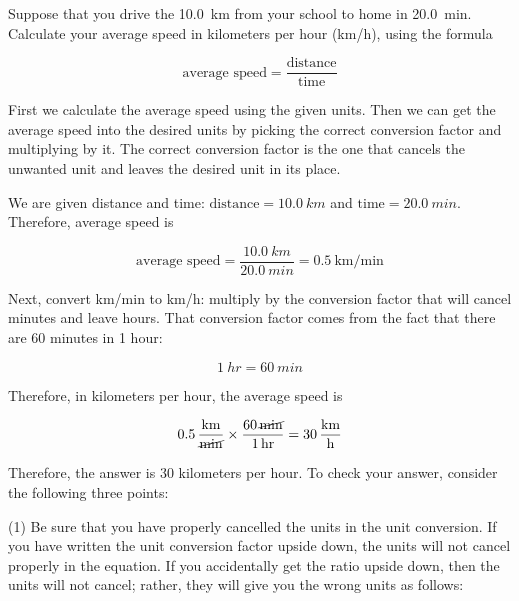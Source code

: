 \documentclass[main-ap-physics.tex]{subfiles}
\begin{document}
\begin{example} \label{W2DilL}
    Suppose that you drive the \SI{10.0}{km} from your school to home in \SI{20.0}{min}. Calculate your average speed in kilometers per hour (km/h), using the formula

    \begin{equation}
        \text{average speed} = \frac{\text{distance}}{\text{time}}
    \end{equation}
\end{example}

\Solution First we calculate the average speed using the given units. Then we can get the average speed into the desired units by picking the correct conversion factor and multiplying by it. The correct conversion factor is the one that cancels the unwanted unit and leaves the desired unit in its place.

\vspace{1em}

We are given distance and time: $\text{distance} = \SI{10.0}{km}$ and $\text{time} = \SI{20.0}{min}$. Therefore, average speed is

\begin{equation*}
    \text{average speed} = \frac{\SI{10.0}{km}}{\SI{20.0}{min}} = \SI[per-mode=fraction]{0.5}{\kilo\meter\per\minute}
\end{equation*}

Next, convert km/min to km/h: multiply by the conversion factor that will cancel minutes and leave hours. That conversion factor comes from the fact that there are 60 minutes in 1 hour:

\begin{equation*}
    \SI{1}{hr} = \SI{60}{min}
\end{equation*}

Therefore, in kilometers per hour, the average speed is

\begin{equation*}
    \SI[per-mode=fraction]{0.5}{\kilo\meter\per\cancel\minute} \times \frac{\SI{60}{\cancel\minute}}{\SI{1}{hr}} = \SI[per-mode=fraction]{30}{\kilo\meter\per\hour}
\end{equation*}

Therefore, the answer is 30 kilometers per hour. To check your answer, consider the following three points: 

\vspace{1em}

(1) Be sure that you have properly cancelled the units in the unit conversion. If you have written the unit conversion factor upside down, the units will not cancel properly in the equation. If you accidentally get the ratio upside down, then the units will not cancel; rather, they will give you the wrong units as follows:
\end{document}
